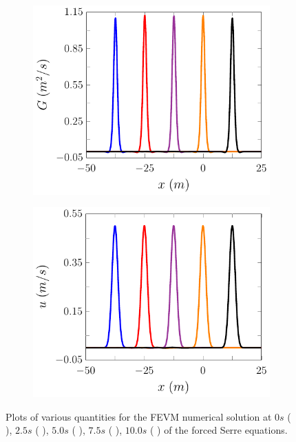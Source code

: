 \begin{figure}
\begin{subfigure}{0.5\textwidth}
		\vspace{0.5cm}
	\end{subfigure}
	\begin{subfigure}{0.5\textwidth}
		\includegraphics[width=\textwidth]{./chp5/figures/Forced/Wet/FEVMExG.pdf}
		\vspace{0.5cm}
	\end{subfigure}%
	\begin{subfigure}{0.5\textwidth}
		\includegraphics[width=\textwidth]{./chp5/figures/Forced/Wet/FEVMExu.pdf}
		\vspace{0.5cm}
	\end{subfigure}
	\caption{Plots of various quantities for the FEVM numerical solution at $0s$ ({\color{blue} \solidrule}), $2.5s$ ({\color{red} \solidrule}), $5.0s$ ({\color{violet!80!white} \solidrule}), $7.5s$ ({\color{orange} \solidrule}), $10.0s$ ({\color{black} \solidrule}) of the forced Serre equations.}
	\label{fig:ForcedWetFEVMP2PExAll}
\end{figure}

